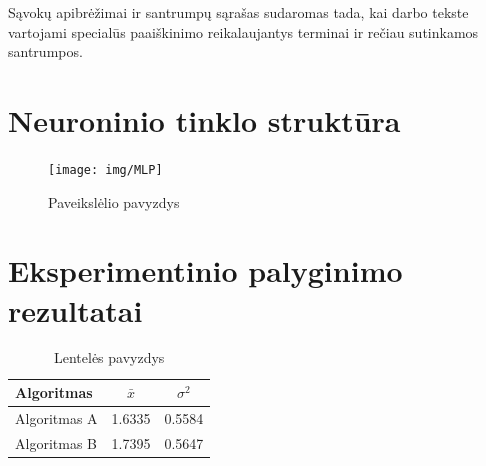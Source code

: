 \documentclass{VUMIFPSkursinis}
\begin{document}
Sąvokų apibrėžimai ir santrumpų sąrašas sudaromas tada, kai darbo tekste
vartojami specialūs paaiškinimo reikalaujantys terminai ir rečiau sutinkamos
santrumpos.

\appendix  %

\section{Neuroninio tinklo struktūra}
\begin{figure}[H]
    \centering
    \texttt{[image: img/MLP]}
    \caption{Paveikslėlio pavyzdys}
    \label{img:mlp}
\end{figure}


\section{Eksperimentinio palyginimo rezultatai}
\begin{table}[H]\footnotesize
  \centering
  \caption{Lentelės pavyzdys}
  {\begin{tabular}{|l|c|c|} \hline
    Algoritmas & $\bar{x}$ & $\sigma^{2}$ \\
    \hline
    Algoritmas A  & 1.6335    & 0.5584       \\
    Algoritmas B  & 1.7395    & 0.5647       \\
    \hline
  \end{tabular}}
  \label{tab:table example}
\end{table}
\end{document}
